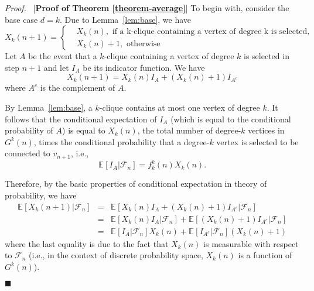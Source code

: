 \documentclass[11pt]{article}
\providecommand{\expectation}[2]{\mathbb{E}_{#2}\left[#1\right]}
\newenvironment{proof}[0]{\textit{Proof.} }{\hfill  $\blacksquare$ }
\providecommand{\vcprob}[3]{f^{#1}_{#2}(#3)}
\providecommand{\rktree}[2]{G^{#1}(#2)}
\providecommand{\tdeg}[2]{X_{#1}(#2)}
\begin{document}
\begin{proof}\ [\textbf{Proof of Theorem \ref{theorem-average}}]
To begin with, consider the base case $d = k$.
Due to Lemma~\ref{lem:base}, we have
\begin{equation}
\tdeg{k}{n+1} = \left \{
   \begin{array}{ll}
    & \tdeg{k}{n}, \textrm{ if a k-clique containing a vertex of degree k is selected}, \\
    & \tdeg{k}{n} + 1, \textrm{ otherwise}
   \end{array}
   \right.
\end{equation}
Let $A$ be the event that a $k$-clique containing a vertex of degree $k$ is selected
in step $n + 1$ and let $I_{A}$ be its indicator function. We have
$$
  X_{k}(n + 1) = X_{k}(n)I_{A} + (X_{k}(n) + 1)I_{A^c} 
$$
where $A^c$ is the complement of $A$.

By Lemma~\ref{lem:base}, a $k$-clique contains at most 
one vertex of degree $k$. It follows that the conditional expectation
of $I_A$ (which is equal to the conditional probability of $A$) 
is equal to $X_{k}(n)$, the  total number of degree-$k$ vertices
in $\rktree{k}{n}$, times the conditional probability that a degree-$k$
vertex is selected to be connected to $v_{n+1}$, i.e.,    
\begin{equation}
\label{eq:condp-base}
  \expectation{I_A | \mathcal{F}_n}{} = \vcprob{k}{k}{n} X_k(n). 
\end{equation}

Therefore, by the basic  properties of conditional expectation in theory of probability,
we have
\begin{eqnarray}
\label{eq:conde-base}
\expectation{\tdeg{k}{n + 1}| \mathcal{F}_n}{} &=& 
    \expectation{\tdeg{k}{n}I_A + (\tdeg{k}{n} + 1) I_{A^c} | \mathcal{F}_n}{} \nonumber \\
 &=& \expectation{\tdeg{k}{n}I_A | \mathcal{F}_n}{} +    
        \expectation{(\tdeg{k}{n} + 1) I_{A^c} | \mathcal{F}_n}{}  \nonumber \\
 &=& \expectation{I_A | \mathcal{F}_n}{}\tdeg{k}{n}
         + \expectation{I_{A^c} | \mathcal{F}_n}{} (\tdeg{k}{n} + 1)  
\end{eqnarray}
where the last equality is due to the fact that $X_{k}(n)$ is measurable
with respect to $\mathcal{F}_n$ (i.e., in the context of discrete probability space, $X_{k}(n)$
is a function of $G^{k}(n)$).


\end{proof}
\end{document}
